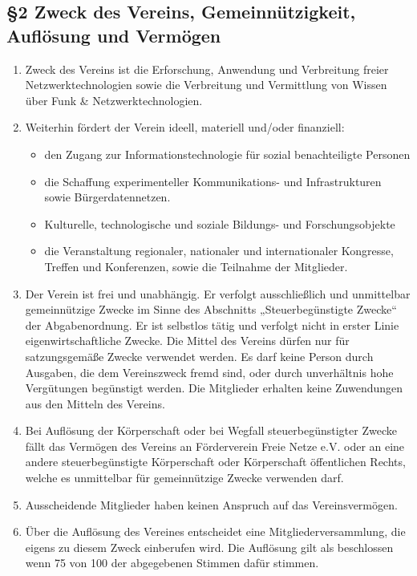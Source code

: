 \documentclass[12pt,a4paper]{article}
\begin{document}
\subsection*{§2 Zweck des Vereins, Gemeinnützigkeit, Auflösung und Vermögen}
\begin{enumerate}
\item Zweck des Vereins ist die Erforschung, Anwendung und Verbreitung freier Netzwerktechnologien sowie die Verbreitung und Vermittlung von Wissen über Funk \& Netzwerktechnologien. 
\item Weiterhin fördert der Verein ideell, materiell und/oder finanziell: 
\begin{itemize}
\item den Zugang zur Informationstechnologie für sozial benachteiligte Personen 
\item die Schaffung experimenteller Kommunikations- und Infrastrukturen sowie Bürgerdatennetzen. 
\item Kulturelle, technologische und soziale Bildungs- und Forschungsobjekte
\item die Veranstaltung regionaler, nationaler und internationaler Kongresse, Treffen und Konferenzen, sowie die Teilnahme der Mitglieder. 
\end{itemize}
\item Der Verein ist frei und unabhängig. Er verfolgt ausschließlich und unmittelbar gemeinnützige Zwecke im Sinne des Abschnitts „Steuerbegünstigte Zwecke“ der Abgabenordnung. Er ist selbstlos tätig und verfolgt nicht in erster Linie eigenwirtschaftliche Zwecke. Die Mittel des Vereins dürfen nur für satzungsgemäße Zwecke verwendet werden. Es darf keine Person durch Ausgaben, die dem Vereinszweck fremd sind, oder durch unverhältnis hohe Vergütungen begünstigt werden. Die Mitglieder erhalten keine Zuwendungen aus den Mitteln des Vereins.
\item Bei Auflösung der Körperschaft oder bei Wegfall steuerbegünstigter Zwecke fällt das Vermögen des Vereins an Förderverein Freie Netze e.V. oder an eine andere steuerbegünstigte Körperschaft oder Körperschaft öffentlichen Rechts, welche es unmittelbar für gemeinnützige Zwecke verwenden darf. 
\item Ausscheidende Mitglieder haben keinen Anspruch auf das Vereinsvermögen. 
\item Über die Auflösung des Vereines entscheidet eine Mitgliederversammlung, die eigens zu diesem Zweck einberufen wird. Die Auflösung gilt als beschlossen wenn 75 von 100 der abgegebenen Stimmen dafür stimmen. 
\end{enumerate}
\end{document}
